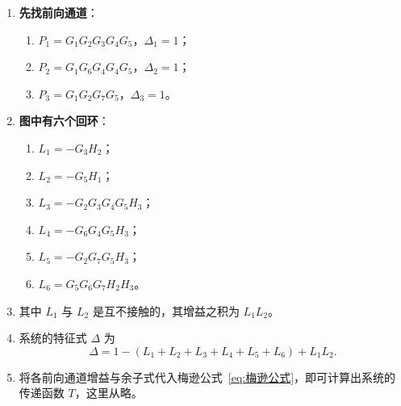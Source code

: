\begin{enumerate}
    \item \textbf{先找前向通道}：
    \begin{enumerate}
        \item $P_1=G_1G_2G_3G_4G_5$，$\Delta_1=1$；
        \item $P_2=G_1G_6G_4G_4G_5$，$\Delta_2=1$；
        \item $P_3=G_1G_2G_7G_5$，$\Delta_3=1$。
    \end{enumerate}
    \item \textbf{图中有六个回环}：
    \begin{enumerate}
        \item $L_1=-G_3H_2$；
        \item $L_2=-G_5H_1$；
        \item $L_3=-G_2G_3G_4G_5H_3$；
        \item $L_4=-G_6G_4G_5H_3$；
        \item $L_5=-G_2G_7G_5H_3$；
        \item $L_6=G_5G_6G_7H_2H_3$。
    \end{enumerate}
    \item 其中 $L_1$ 与 $L_2$ 是互不接触的，其增益之积为 $L_1L_2$。
    \item 系统的特征式 $\Delta$ 为
    \begin{equation}
    \Delta=1-(L_1+L_2+L_3+L_4+L_5+L_6)+L_1L_2.
    \label{eq:例题的特征式}
    \end{equation}
    \item 将各前向通道增益与余子式代入梅逊公式~\eqref{eq:梅逊公式}，即可计算出系统的传递函数 $T$，这里从略。
\end{enumerate}
